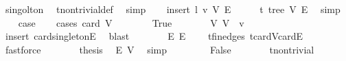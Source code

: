 \begin{isabellebody}
\ singolton\ \isamarkupfalse%
\ t{\isachardot}{\kern0pt}non{\isacharunderscore}{\kern0pt}trivial{\isacharunderscore}{\kern0pt}def\ \isamarkupfalse%
\ simp\isanewline
{}\isamarkupfalse%
\isanewline
\ \ \isamarkupfalse%
\ {\isacharparenleft}{\kern0pt}insert\ l\ v\ V{\isacharprime}{\kern0pt}\ E{\isacharprime}{\kern0pt}{\isacharparenright}{\kern0pt}\isanewline
\ \ \isamarkupfalse%
\ \isamarkupfalse%
\ t{\isacharcolon}{\kern0pt}\ tree\ V{\isacharprime}{\kern0pt}\ E{\isacharprime}{\kern0pt}\ \isamarkupfalse%
\ simp\isanewline
\ \ \isamarkupfalse%
\ {\isacharquery}{\kern0pt}case\isanewline
\ \ \isamarkupfalse%
\ {\isacharparenleft}{\kern0pt}cases\ {\isachardoublequoteopen}card\ V{\isacharprime}{\kern0pt}\ {\isacharequal}{\kern0pt}\ {}{\isachardoublequoteclose}{\isacharparenright}{\kern0pt}\isanewline
\ \ \ \ \isamarkupfalse%
\ True\isanewline
\ \ \ \ \isamarkupfalse%
\ \isamarkupfalse%
\ V{\isacharcolon}{\kern0pt}\ {\isachardoublequoteopen}V{\isacharprime}{\kern0pt}\ {\isacharequal}{\kern0pt}\ {\isacharbraceleft}{\kern0pt}v{\isacharbraceright}{\kern0pt}{\isachardoublequoteclose}\ \isamarkupfalse%
\ insert{\isacharparenleft}{\kern0pt}{}{\isacharparenright}{\kern0pt}\ card{\isacharunderscore}{\kern0pt}{}{\isacharunderscore}{\kern0pt}singletonE\ \isamarkupfalse%
\ blast\isanewline
\ \ \ \ \isamarkupfalse%
\ \isamarkupfalse%
\ E{\isacharcolon}{\kern0pt}\ {\isachardoublequoteopen}E{\isacharprime}{\kern0pt}\ {\isacharequal}{\kern0pt}\ {\isacharbraceleft}{\kern0pt}{\isacharbraceright}{\kern0pt}{\isachardoublequoteclose}\ \isamarkupfalse%
\ t{\isachardot}{\kern0pt}fin{\isacharunderscore}{\kern0pt}edges\ t{\isachardot}{\kern0pt}card{\isacharunderscore}{\kern0pt}V{\isacharunderscore}{\kern0pt}card{\isacharunderscore}{\kern0pt}E\ \isamarkupfalse%
\ fastforce\isanewline
\ \ \ \ \isamarkupfalse%
\ \isamarkupfalse%
\ {\isacharquery}{\kern0pt}thesis\ \isamarkupfalse%
\ E\ V\ \isamarkupfalse%
\ simp\isanewline
\ \ \isamarkupfalse%
\isanewline
\ \ \ \ \isamarkupfalse%
\ False\isanewline
\ \ \ \ \isamarkupfalse%
\ \isamarkupfalse%
\ {\isachardoublequoteopen}t{\isachardot}{\kern0pt}non{\isacharunderscore}{\kern0pt}trivial{\isachardoublequoteclose}\ \isamarkupfalse%

\end{isabellebody}
